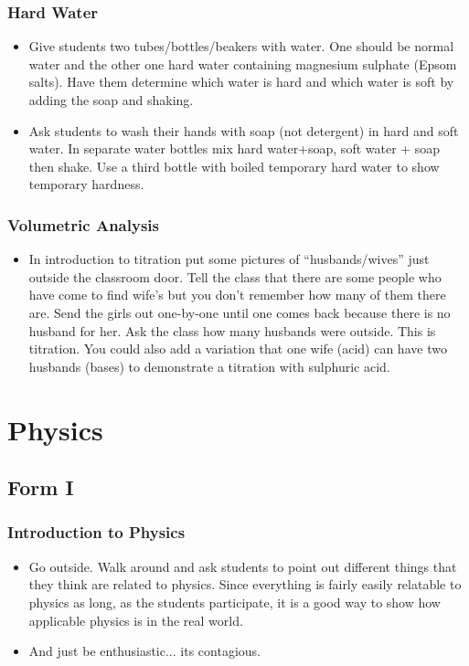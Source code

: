 \subsubsection{Hard Water}
\begin{itemize}
\item Give students two tubes/bottles/beakers with water. One should be normal water and the other one hard water containing magnesium sulphate (Epsom salts). Have them determine which water is hard and which water is soft by adding the soap and shaking.
\item Ask students to wash their hands with soap (not
detergent) in hard and soft water.  In separate water bottles mix hard
water+soap, soft water + soap then shake.  Use a third bottle with
boiled temporary hard water to show temporary hardness.
\end{itemize}

\subsubsection{Volumetric Analysis}
\begin{itemize}
\item	In introduction to titration put some pictures of ``husbands/wives'' just outside the classroom door. Tell the class that there are some people who have come to find wife's but you don't remember how many of them there are. Send the girls out one-by-one until one comes back because there is no husband for her. Ask the class how many husbands were outside. This is titration.
You could also add a variation that one wife (acid) can have two husbands (bases) to demonstrate a titration with sulphuric acid.
\end{itemize}


\section{Physics}
\subsection{Form I}
\subsubsection{Introduction to Physics}
\begin{itemize}
\item	Go outside. Walk around and ask students to point out different things that they think are related to physics. Since everything is fairly easily relatable to physics as long, as the students participate, it is a good way to show how applicable physics is in the real world. 
\item	And just be enthusiastic... its contagious. 
\end{itemize}

